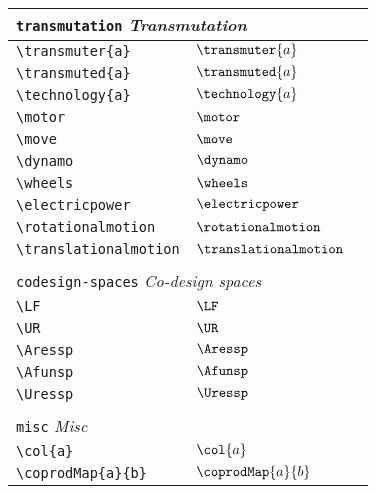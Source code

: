 \begin{longtable}{lll}
 \multicolumn{3}{l}{{\color[rgb]{0.5,0.5,0.5}\texttt{transmutation}} \emph{Transmutation}}\\ 
 \hline
\hline
{\color[rgb]{0.5,0.5,0.5}\texttt{\textbackslash transmuter\{a\}}} & $\transmuter{a}$ & \\ 
 {\color[rgb]{0.5,0.5,0.5}\texttt{\textbackslash transmuted\{a\}}} & $\transmuted{a}$ & \\ 
 {\color[rgb]{0.5,0.5,0.5}\texttt{\textbackslash technology\{a\}}} & $\technology{a}$ & \\ 
 {\color[rgb]{0.5,0.5,0.5}\texttt{\textbackslash motor}} & $\motor$ & \\ 
 {\color[rgb]{0.5,0.5,0.5}\texttt{\textbackslash move}} & $\move$ & \\ 
 {\color[rgb]{0.5,0.5,0.5}\texttt{\textbackslash dynamo}} & $\dynamo$ & \\ 
 {\color[rgb]{0.5,0.5,0.5}\texttt{\textbackslash wheels}} & $\wheels$ & \\ 
 {\color[rgb]{0.5,0.5,0.5}\texttt{\textbackslash electricpower}} & $\electricpower$ & \\ 
 {\color[rgb]{0.5,0.5,0.5}\texttt{\textbackslash rotationalmotion}} & $\rotationalmotion$ & \\ 
 {\color[rgb]{0.5,0.5,0.5}\texttt{\textbackslash translationalmotion}} & $\translationalmotion$ & \\ 
  &  & \\ 
 \multicolumn{3}{l}{{\color[rgb]{0.5,0.5,0.5}\texttt{codesign-spaces}} \emph{Co-design spaces}}\\ 
 \hline
\hline
{\color[rgb]{0.5,0.5,0.5}\texttt{\textbackslash LF}} & $\LF$ & \\ 
 {\color[rgb]{0.5,0.5,0.5}\texttt{\textbackslash UR}} & $\UR$ & \\ 
 {\color[rgb]{0.5,0.5,0.5}\texttt{\textbackslash Aressp}} & $\Aressp$ & \\ 
 {\color[rgb]{0.5,0.5,0.5}\texttt{\textbackslash Afunsp}} & $\Afunsp$ & \\ 
 {\color[rgb]{0.5,0.5,0.5}\texttt{\textbackslash Uressp}} & $\Uressp$ & \\ 
  &  & \\ 
 \multicolumn{3}{l}{{\color[rgb]{0.5,0.5,0.5}\texttt{misc}} \emph{Misc}}\\ 
 \hline
\hline
{\color[rgb]{0.5,0.5,0.5}\texttt{\textbackslash col\{a\}}} & $\col{a}$ & \\ 
 {\color[rgb]{0.5,0.5,0.5}\texttt{\textbackslash coprodMap\{a\}\{b\}}} & $\coprodMap{a}{b}$ & \\ 

\end{longtable}
